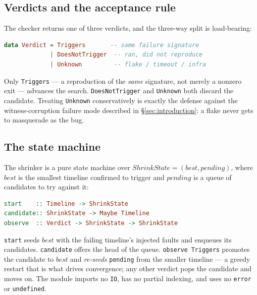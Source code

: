 \documentclass[10pt,twocolumn,letterpaper]{article}
\begin{document}
\subsection{Verdicts and the acceptance rule}
The checker returns one of three verdicts, and the three-way split is
load-bearing:
\begin{lstlisting}[language=Haskell]
data Verdict = Triggers       -- same failure signature
             | DoesNotTrigger  -- ran, did not reproduce
             | Unknown         -- flake / timeout / infra
\end{lstlisting}
Only \texttt{Triggers} --- a reproduction of the \emph{same} signature, not
merely a nonzero exit --- advances the search. \texttt{DoesNotTrigger} and
\texttt{Unknown} both discard the candidate. Treating \texttt{Unknown}
conservatively is exactly the defense against the witness-corruption failure mode
described in \S\ref{sec:introduction}: a flake never gets to masquerade as the
bug.

\subsection{The state machine}
The shrinker is a pure state machine over
$\mathit{ShrinkState} = (\mathit{best}, \mathit{pending})$, where $\mathit{best}$
is the smallest timeline confirmed to trigger and $\mathit{pending}$ is a queue
of candidates to try against it:
\begin{lstlisting}[language=Haskell]
start    :: Timeline -> ShrinkState
candidate:: ShrinkState -> Maybe Timeline
observe  :: Verdict -> ShrinkState -> ShrinkState
\end{lstlisting}
\texttt{start} seeds $\mathit{best}$ with the failing timeline's injected faults
and enqueues its candidates. \texttt{candidate} offers the head of the queue.
\texttt{observe Triggers} promotes the candidate to $\mathit{best}$ and
\emph{re-seeds} \texttt{pending} from the smaller timeline --- a greedy restart
that is what drives convergence; any other verdict pops the candidate and moves
on. The module imports no \texttt{IO}, has no partial indexing, and uses no
\texttt{error} or \texttt{undefined}.
\end{document}

